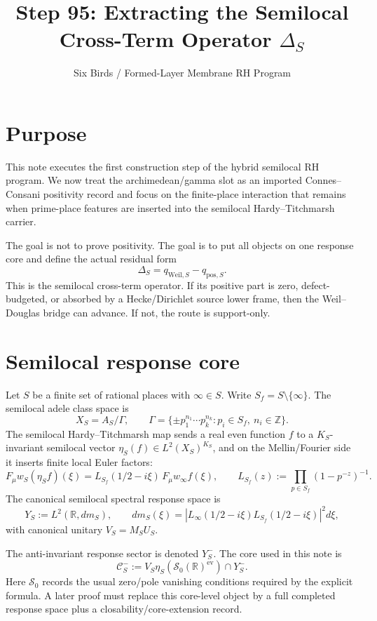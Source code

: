 \documentclass[11pt]{article}
\newcommand{\R}{\mathbb R}
\newcommand{\CS}{\mathcal C}
\newcommand{\Pos}{\mathrm{pos}}
\newcommand{\Weil}{\mathrm{Weil}}
\begin{document}
\title{Step 95: Extracting the Semilocal Cross-Term Operator $\Delta_S$}
\author{Six Birds / Formed-Layer Membrane RH Program}
\date{}
\maketitle

\section{Purpose}
This note executes the first construction step of the hybrid semilocal RH program.  We now treat the archimedean/gamma slot as an imported Connes--Consani positivity record and focus on the finite-place interaction that remains when prime-place features are inserted into the semilocal Hardy--Titchmarsh carrier.

The goal is not to prove positivity.  The goal is to put all objects on one response core and define the actual residual form
\[
\boxed{
\Delta_S
=
q_{\Weil,S}-q_{\Pos,S}.
}
\]
This is the semilocal cross-term operator.  If its positive part is zero, defect-budgeted, or absorbed by a Hecke/Dirichlet source lower frame, then the Weil--Douglas bridge can advance.  If not, the route is support-only.

\section{Semilocal response core}
Let $S$ be a finite set of rational places with $\infty\in S$.  Write $S_f=S\setminus\{\infty\}$.  The semilocal adele class space is
\[
X_S=A_S/\Gamma,
\qquad
\Gamma=\{\pm p_1^{n_1}\cdots p_k^{n_k}:p_i\in S_f,\ n_i\in\mathbb Z\}.
\]
The semilocal Hardy--Titchmarsh map sends a real even function $f$ to a $K_S$-invariant semilocal vector $\eta_S(f)\in L^2(X_S)^{K_S}$, and on the Mellin/Fourier side it inserts finite local Euler factors:
\[
F_\mu w_S(\eta_S f)(\xi)
= L_{S_f}(1/2-i\xi)\,F_\mu w_\infty f(\xi),
\qquad
L_{S_f}(z):=\prod_{p\in S_f}(1-p^{-z})^{-1}.
\]
The canonical semilocal spectral response space is
\[
Y_S:=L^2(\R,dm_S),
\qquad
 dm_S(\xi)=|L_\infty(1/2-i\xi)L_{S_f}(1/2-i\xi)|^2d\xi,
\]
with canonical unitary $V_S=M_SU_S$.

The anti-invariant response sector is denoted $Y_S^-$.  The core used in this note is
\[
\boxed{
\CS_S^-:=V_S\eta_S(\mathcal S_0(\R)^{\mathrm{ev}})\cap Y_S^-.
}
\]
Here $\mathcal S_0$ records the usual zero/pole vanishing conditions required by the explicit formula.  A later proof must replace this core-level object by a full completed response space plus a closability/core-extension record.
\end{document}
